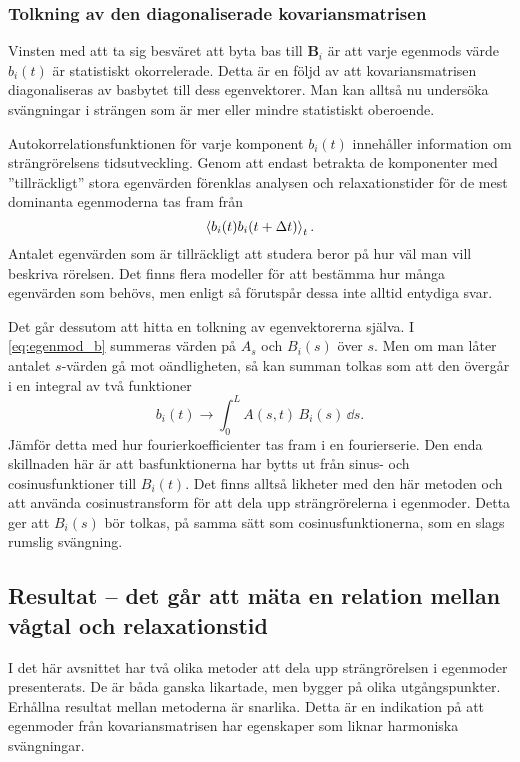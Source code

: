 \subsubsection{Tolkning av den diagonaliserade kovariansmatrisen}

Vinsten med att ta sig besväret att byta bas till $\mathbf{B}_i$ är att varje egenmods värde $b_i(t)$ är statistiskt okorrelerade. Detta är en följd av att kovariansmatrisen diagonaliseras av basbytet till dess egenvektorer\cite{Gustafsson_LaNa}. Man kan alltså nu undersöka svängningar i strängen som är mer eller mindre statistiskt oberoende. 

Autokorrelationsfunktionen för varje komponent $b_i(t)$ innehåller information om strängrörelsens tidsutveckling. Genom att endast betrakta de komponenter med ''tillräckligt'' stora egenvärden förenklas analysen och relaxationstider för de mest dominanta egenmoderna tas fram från 
\begin{equation}
\label{eq:korrmoder}
    \ev{b_i(t)b_i(t+\Delta t)}_t.
\end{equation}
Antalet egenvärden som är tillräckligt att studera beror på hur väl man vill beskriva rörelsen. Det finns flera modeller för att bestämma hur många egenvärden som behövs, men enligt \cite{Cangelosi2007} så förutspår dessa inte alltid entydiga svar. 

Det går dessutom att hitta en tolkning av egenvektorerna själva. I \eqref{eq:egenmod_b} summeras värden på $A_s$ och $B_i(s)$ över $s$. Men om man låter antalet $s$-värden gå mot oändligheten, så kan summan tolkas som att den övergår i en integral av två funktioner
\begin{equation} \label{eq:egenmoder_fourierkoef}
b_i(t) \to \int_0^L A(s, t)\,B_i(s) \,\dd{s}.
\end{equation}
Jämför detta med hur fourierkoefficienter tas fram i en fourierserie. Den enda skillnaden här är att basfunktionerna har bytts ut från sinus- och cosinusfunktioner till $B_i(t)$. Det finns alltså likheter med den här metoden och att använda cosinustransform för att dela upp strängrörelerna i egenmoder. Detta ger att $B_i(s)$ bör tolkas, på samma sätt som cosinusfunktionerna, som en slags rumslig svängning.


\subsection{Resultat -- det går att mäta en relation mellan vågtal och relaxationstid}
I det här avsnittet har två olika metoder att dela upp strängrörelsen i egenmoder presenterats. De är båda ganska likartade, men bygger på olika utgångspunkter. Erhållna resultat mellan metoderna är snarlika. Detta är en indikation på att egenmoder från kovariansmatrisen har egenskaper som liknar harmoniska svängningar. 


